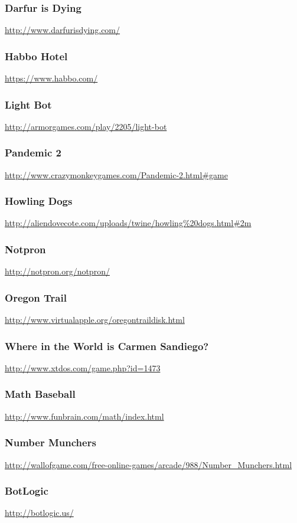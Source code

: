 \subsubsection{Darfur is Dying}\url{http://www.darfurisdying.com/}\subsubsection{Habbo Hotel}\url{https://www.habbo.com/}\subsubsection{Light Bot}\url{http://armorgames.com/play/2205/light-bot}\subsubsection{Pandemic 2}\url{http://www.crazymonkeygames.com/Pandemic-2.html#game}\subsubsection{Howling Dogs}\url{http://aliendovecote.com/uploads/twine/howling%20dogs.html#2m}\subsubsection{Notpron}\url{http://notpron.org/notpron/}\subsubsection{Oregon Trail}\url{http://www.virtualapple.org/oregontraildisk.html}\subsubsection{Where in the World is Carmen Sandiego?}\url{http://www.xtdos.com/game.php?id=1473}\subsubsection{Math Baseball}\url{http://www.funbrain.com/math/index.html}\subsubsection{Number Munchers}\url{http://wallofgame.com/free-online-games/arcade/988/Number_Munchers.html}\subsubsection{BotLogic}\url{http://botlogic.us/}